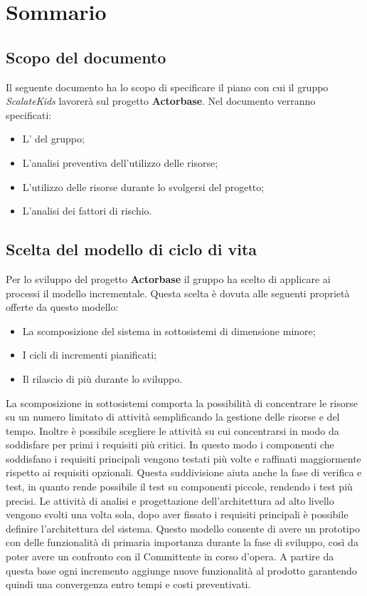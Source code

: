 \documentclass{scalatekids-article}
\begin{document}
\section{Sommario}
\subsection{Scopo del documento}
Il seguente documento ha lo scopo di specificare il piano con cui il gruppo \textit{ScalateKids} lavorerà sul progetto \textbf{Actorbase}.
Nel documento verranno specificati:
\begin{itemize}
\item {L' del gruppo;}
\item {L'analisi preventiva dell'utilizzo delle risorse;}
\item {L'utilizzo delle risorse durante lo svolgersi del progetto;}
\item {L'analisi dei fattori di rischio.}
\end{itemize}
\prodPurpose
\glossExpl
\subsection{Scelta del modello di ciclo di vita}
Per lo sviluppo del progetto \textbf{Actorbase} il gruppo ha scelto di applicare ai processi il modello incrementale. Questa scelta è dovuta alle seguenti proprietà offerte da questo modello:
\begin{itemize}
\item {La scomposizione del sistema in sottosistemi di dimensione minore;}
\item {I cicli di incrementi pianificati;}
\item {Il rilascio di più  durante lo sviluppo.}
\end{itemize}
La scomposizione in sottosistemi comporta la possibilità di concentrare le risorse su un numero limitato di attività semplificando la gestione delle risorse e del tempo. Inoltre è possibile scegliere le attività su cui concentrarsi in modo da soddisfare per primi i requisiti più critici. In questo modo i componenti che soddisfano i requisiti principali vengono testati più volte e raffinati maggiormente rispetto ai requisiti opzionali. Questa suddivisione aiuta anche la fase di verifica e test, in quanto rende possibile il test su componenti piccole, rendendo i test più precisi. Le attività di analisi e progettazione dell'architettura ad alto livello vengono svolti una volta sola, dopo aver fissato i requisiti principali è possibile definire l'architettura del sistema. Questo modello consente di avere un prototipo con delle funzionalità di primaria importanza durante la fase di sviluppo, così da poter avere un confronto con il Committente in corso d'opera. A partire da questa base ogni incremento aggiunge nuove funzionalità al prodotto garantendo quindi una convergenza entro tempi e costi preventivati.
\end{document}
